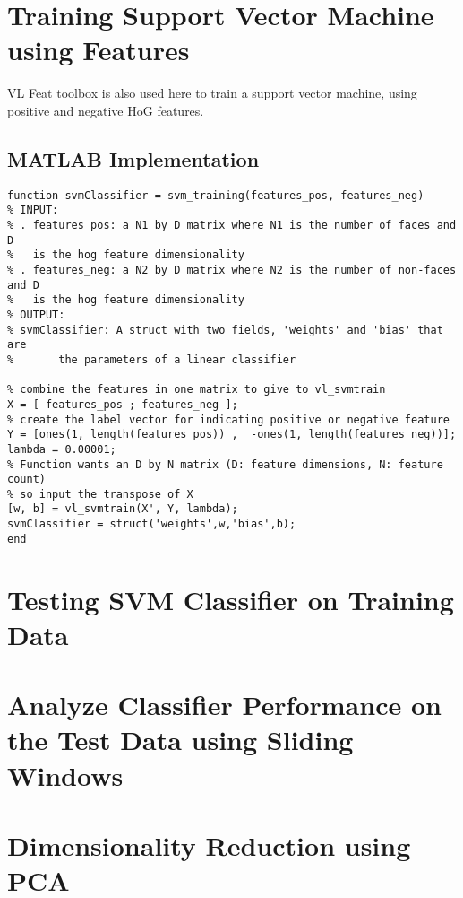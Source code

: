 \documentclass{article}
\begin{document}
\section{Training Support Vector Machine using Features}
VL Feat toolbox is also used here to train a support vector machine, using positive and negative HoG features.

\subsection{MATLAB Implementation}

\begin{lstlisting}[caption={My implementation of svm\_training function.},captionpos=b]
function svmClassifier = svm_training(features_pos, features_neg)
% INPUT:
% . features_pos: a N1 by D matrix where N1 is the number of faces and D
%   is the hog feature dimensionality
% . features_neg: a N2 by D matrix where N2 is the number of non-faces and D
%   is the hog feature dimensionality
% OUTPUT:
% svmClassifier: A struct with two fields, 'weights' and 'bias' that are
%       the parameters of a linear classifier

% combine the features in one matrix to give to vl_svmtrain
X = [ features_pos ; features_neg ];
% create the label vector for indicating positive or negative feature 
Y = [ones(1, length(features_pos)) ,  -ones(1, length(features_neg))];
lambda = 0.00001;
% Function wants an D by N matrix (D: feature dimensions, N: feature count)
% so input the transpose of X
[w, b] = vl_svmtrain(X', Y, lambda);
svmClassifier = struct('weights',w,'bias',b);
end
\end{lstlisting}

\section{Testing SVM Classifier on Training Data}


\section{Analyze Classifier Performance on the Test Data using Sliding Windows}

\section{Dimensionality Reduction using PCA}
\end{document}
